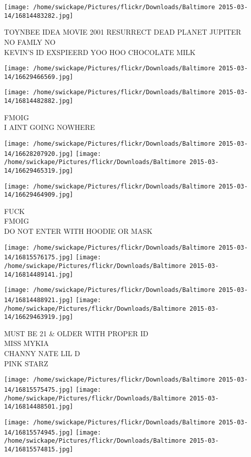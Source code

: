 \documentclass[10pt,letterpaper]{article}
\begin{document}
\texttt{[image: /home/swickape/Pictures/flickr/Downloads/Baltimore 2015-03-14/16814483282.jpg]}

TOYNBEE IDEA MOVIE 2001 RESURRECT DEAD PLANET JUPITER\\
NO FAMLY NO\\
KEVIN'S ID EXSPIEERD YOO HOO CHOCOLATE MILK
\pagebreak

\texttt{[image: /home/swickape/Pictures/flickr/Downloads/Baltimore 2015-03-14/16629466569.jpg]}

\vspace{0.25in}
\texttt{[image: /home/swickape/Pictures/flickr/Downloads/Baltimore 2015-03-14/16814482882.jpg]}

FMOIG\\
I AINT GOING NOWHERE
\pagebreak

\texttt{[image: /home/swickape/Pictures/flickr/Downloads/Baltimore 2015-03-14/16628207920.jpg]}
\texttt{[image: /home/swickape/Pictures/flickr/Downloads/Baltimore 2015-03-14/16629465319.jpg]}

\vspace{0.25in}
\texttt{[image: /home/swickape/Pictures/flickr/Downloads/Baltimore 2015-03-14/16629464909.jpg]}

FUCK\\
FMOIG\\
DO NOT ENTER WITH HOODIE OR MASK
\pagebreak

\texttt{[image: /home/swickape/Pictures/flickr/Downloads/Baltimore 2015-03-14/16815576175.jpg]}
\texttt{[image: /home/swickape/Pictures/flickr/Downloads/Baltimore 2015-03-14/16814489141.jpg]}

\texttt{[image: /home/swickape/Pictures/flickr/Downloads/Baltimore 2015-03-14/16814488921.jpg]}
\texttt{[image: /home/swickape/Pictures/flickr/Downloads/Baltimore 2015-03-14/16629463919.jpg]}

MUST BE 21 \& OLDER WITH PROPER ID\\
MISS MYKIA\\
CHANNY NATE LIL D\\
PINK STARZ
\pagebreak

\texttt{[image: /home/swickape/Pictures/flickr/Downloads/Baltimore 2015-03-14/16815575475.jpg]}
\texttt{[image: /home/swickape/Pictures/flickr/Downloads/Baltimore 2015-03-14/16814488501.jpg]}

\texttt{[image: /home/swickape/Pictures/flickr/Downloads/Baltimore 2015-03-14/16815574945.jpg]}
\texttt{[image: /home/swickape/Pictures/flickr/Downloads/Baltimore 2015-03-14/16815574815.jpg]}
\end{document}
